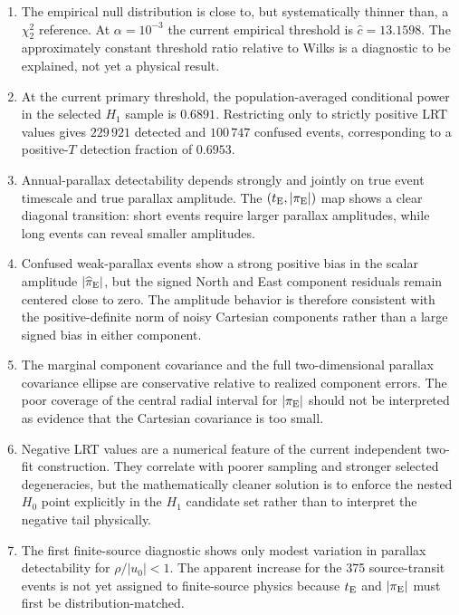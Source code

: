 \documentclass[11pt,a4paper]{article}
\newcommand{\te}{t_{\rm E}}
\newcommand{\Hnull}{H_0}
\newcommand{\Halt}{H_1}
\begin{document}
\begin{enumerate}[leftmargin=2em]
    \item The empirical null distribution is close to, but systematically thinner than, a
    $\chi^2_2$ reference.  At $\alpha=10^{-3}$ the current empirical threshold is
    $\widehat c=13.1598$.  The approximately constant threshold ratio relative to Wilks is a
    diagnostic to be explained, not yet a physical result.

    \item At the current primary threshold, the population-averaged conditional power in the
    selected $\Halt$ sample is $0.6891$.  Restricting only to strictly positive LRT values gives
    $229\,921$ detected and $100\,747$ confused events, corresponding to a positive-$T$
    detection fraction of $0.6953$.

    \item Annual-parallax detectability depends strongly and jointly on true event timescale and
    true parallax amplitude.  The $(\te,|\pi_{\rm E}|)$ map shows a clear diagonal transition:
    short events require larger parallax amplitudes, while long events can reveal smaller
    amplitudes.

    \item Confused weak-parallax events show a strong positive bias in the scalar amplitude
    $|\widehat{\pi}_{\rm E}|$, but the signed North and East component residuals remain centered
    close to zero.  The amplitude behavior is therefore consistent with the positive-definite
    norm of noisy Cartesian components rather than a large signed bias in either component.

    \item The marginal component covariance and the full two-dimensional parallax covariance
    ellipse are conservative relative to realized component errors.  The poor coverage of the
    central radial interval for $|\pi_{\rm E}|$ should not be interpreted as evidence that the
    Cartesian covariance is too small.

    \item Negative LRT values are a numerical feature of the current independent two-fit
    construction.  They correlate with poorer sampling and stronger selected degeneracies, but
    the mathematically cleaner solution is to enforce the nested $\Hnull$ point explicitly in
    the $\Halt$ candidate set rather than to interpret the negative tail physically.

    \item The first finite-source diagnostic shows only modest variation in parallax
    detectability for $\rho/|u_0|<1$.  The apparent increase for the 375 source-transit events is
    not yet assigned to finite-source physics because $\te$ and $|\pi_{\rm E}|$ must first be
    distribution-matched.
\end{enumerate}
\end{document}
